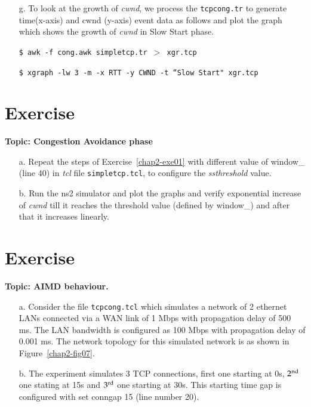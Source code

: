 \begin{multicols}{2}
\begin{itemize}
\item[g.] To look at the growth of \textit{cwnd}, we process the \texttt{tcpcong.tr} to generate time(x-axis) and cwnd (y-axis) event data as follows and plot the graph \cite{art2-key15} which shows the growth of \textit{cwnd} in Slow Start phase.

\texttt{\$  awk -f cong.awk simpletcp.tr $>$ xgr.tcp}

\texttt{\$ xgraph -lw 3 -m -x RTT -y CWND -t ``Slow Start" xgr.tcp}
\end{itemize}

\section*{Exercise \label{chap2-exe02}}

\textbf{Topic: Congestion Avoidance phase}
\begin{itemize}

\item[a.] Repeat the steps of Exercise~\ref{chap2-exe01} with different value of window\_ (line 40) in \textit{tcl} file \texttt{simpletcp.tcl}, to configure the \textit{ssthreshold} value.

\item[b.] Run the ns2 simulator and plot the graphs and verify  exponential increase of \textit{cwnd} till it reaches the threshold value (defined by window\_) and after that it increases linearly.
\end{itemize}

\section*{Exercise \label{chap2-exe03}}

\textbf{Topic: AIMD behaviour.}

\begin{itemize}

\item[a.] Consider the file \texttt{tcpcong.tcl} which simulates a network of 2 ethernet LANs connected via a WAN link of 1 Mbps with propagation delay of 500 ms. The LAN bandwidth is configured as 100 Mbps with propagation delay of 0.001 ms. The network topology for this simulated network is as shown in Figure~\ref{chap2-fig07}.

\item[b.] The experiment simulates 3 TCP connections, first one starting at 0s, ${\rm 2}^{\text{nd}}$ one stating at 15s and ${\rm 3}^{\text{rd}}$ one starting at 30s. This starting time gap is configured with set conngap 15 (line number 20).


\end{itemize}
\end{multicols}
